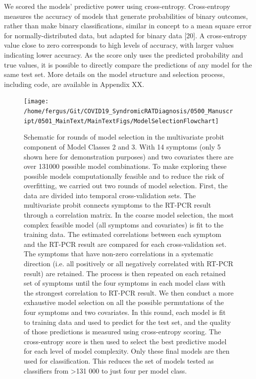\documentclass[]{elsarticle} %
\begin{document}
We scored the models' predictive power using cross-entropy.
Cross-entropy measures the accuracy of models that generate probabilities of binary outcomes, rather than make binary classifications, similar in concept to a mean square error for normally-distributed data, but adapted for binary data {[}20{]}.
A cross-entropy value close to zero corresponds to high levels of accuracy, with larger values indicating lower accuracy.
As the score only uses the predicted probability and true values, it is possible to directly compare the predictions of any model for the same test set.
More details on the model structure and selection process, including code, are available in Appendix XX.

\begin{figure}
\texttt{[image: /home/fergus/Git/COVID19\_SyndromicRATDiagnosis/0500\_Manuscript/0501\_MainText/MainTextFigs/ModelSelectionFlowchart]} \caption{Schematic for rounds of model selection in the multivariate probit component of Model Classes 2 and 3. With 14 symptoms (only 5 shown here for demonstration purposes) and two covariates there are over 131000 possible model combinations. To make exploring these possible models computationally feasible and to reduce the risk of overfitting, we carried out two rounds of model selection. First, the data are divided into temporal cross-validation sets. The multivariate probit connects symptoms to the RT-PCR result through a correlation matrix. In the coarse model selection, the most complex feasible model (all symptoms and covariates) is fit to the training data. The estimated correlations between each symptom and the RT-PCR result are compared for each cross-validation set. The symptoms that have non-zero correlations in a systematic direction (i.e. all positively or all negatively correlated with RT-PCR result) are retained. The process is then repeated on each retained set of symptoms until the four symptoms in each model class with the strongest correlation to RT-PCR result. We then conduct a more exhaustive model selection on all the possible permutations of the four symptoms and two covariates. In this round, each model is fit to training data and used to predict for the test set, and the quality of those predictions is measured using cross-entropy scoring. The cross-entropy score is then used to select the best predictive model for each level of model complexity. Only these final models are then used for classification. This reduces the set of models tested as classifiers from >131 000 to just four per model class.}\label{fig:modsel-flowchart}
\end{figure}
\end{document}
